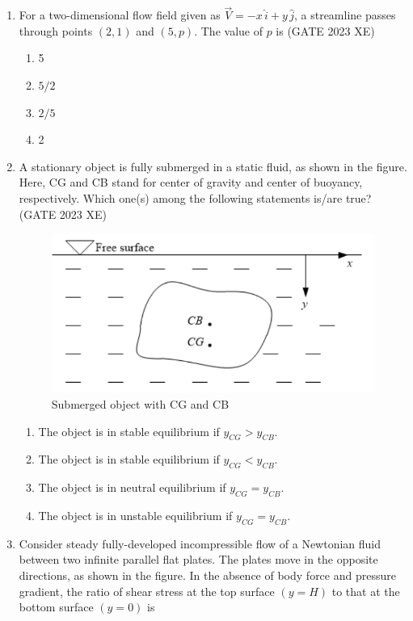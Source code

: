 \documentclass[journal,12pt,onecolumn]{IEEEtran}
\begin{document}
\begin{enumerate}
\newpage

\item For a two-dimensional flow field given as $\vec{V}= -x\,\hat{i} + y\,\hat{j}$, a streamline passes
through points $(2,1)$ and $(5,p)$. The value of $p$ is
\hfill{(GATE 2023 XE)}
\begin{multicols}{2}
\begin{enumerate}
\item 5
\item $5/2$
\item $2/5$
\item 2
\end{enumerate}
\end{multicols}


\item A stationary object is fully submerged in a static fluid, as shown in the figure. Here,
CG and CB stand for center of gravity and center of buoyancy, respectively. Which
one(s) among the following statements is/are true?
\hfill{(GATE 2023 XE)}
\begin{figure}[htbp]
\centering
\includegraphics[width=0.7\columnwidth]{figs/B/fig6.png}
\caption{Submerged object with CG and CB}
\label{fig:figs/B/fig6.png}
\end{figure}

\begin{multicols}{2}
\begin{enumerate}
\item The object is in stable equilibrium if $y_{CG}>y_{CB}$.
\item The object is in stable equilibrium if $y_{CG}<y_{CB}$.
\item The object is in neutral equilibrium if $y_{CG}=y_{CB}$.
\item The object is in unstable equilibrium if $y_{CG}=y_{CB}$.
\end{enumerate}
\end{multicols}

\item Consider steady fully-developed incompressible flow of a Newtonian fluid
between two infinite parallel flat plates. The plates move in the opposite
directions, as shown in the figure. In the absence of body force and pressure
gradient, the ratio of shear stress at the top surface $(y=H)$ to that at the bottom
surface $(y=0)$ is


\end{enumerate}
\end{document}
